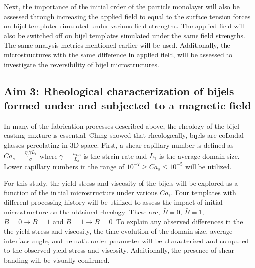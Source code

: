 Next, the importance of the initial order of the particle monolayer will also be assessed through increasing the applied field to equal to the surface tension forces on bijel templates simulated under various field strengths. The applied field will also be switched off on bijel templates simulated under the same field strengths. The same analysis metrics mentioned earlier will be used. Additionally, the microstructures with the same difference in applied field,  will be assessed to investigate the reversibility of bijel microstructures. 

\subsection{Aim 3: Rheological characterization of bijels formed under and subjected to a magnetic field}
\label{section:aim3_desc}

In many of the fabrication processes described above, the rheology of the bijel casting mixture is essential. \cite{haase_continuous_2015, cai_bijels_2017, amirfattahi_fabrication_2024} Ching showed that rheologically, bijels are colloidal glasses percolating in 3D space. \cite{ching_bijel_2022} First, a shear capillary number is defined as $Ca_s = \frac{\eta_{f} \dot{\gamma} L_{1}}{\sigma}$ where $\dot{\gamma} = \frac{u_{LE}}{L_x}$ is the strain rate and $L_1$ is the average domain size. \cite{frijters_effects_2012, yang_capillary_2022} Lower capillary numbers in the range of $ 10^{-7} \geq Ca_s \leq 10^{-5}$ will be utilized. 

For this study, the yield stress and viscosity of the bijels will be explored as a function of the initial microstructure under various $Ca_s$. Four templates with different processing history will be utilized to assess the impact of initial microstructure on the obtained rheology. These are, $\bar{B} = 0$, $\bar{B} = 1$, $\bar{B} = 0 \rightarrow \bar{B} = 1$ and $\bar{B} = 1 \rightarrow \bar{B} = 0$. To explain any observed differences in the the yield stress and viscosity, the time evolution of the domain size, average interface angle, and nematic order parameter will be characterized and compared to the observed yield stress and viscosity. Additionally, the presence of shear banding will be visually confirmed.